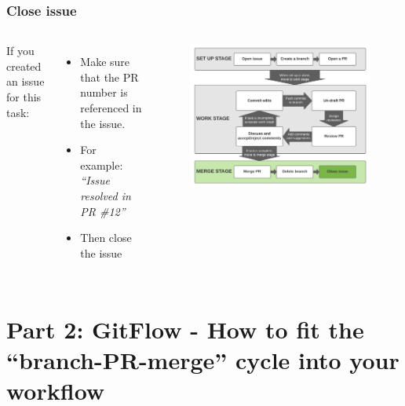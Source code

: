 \documentclass[aspectratio=169]{beamer} %
\begin{document}
\begin{frame}
	\frametitle{Close issue}
	\begin{columns}[c]

		If you created an issue for this task:
		\begin{itemize}
			\setlength\itemsep{.5em}
			\item Make sure that the PR number is referenced in the issue.
			\item For example: \textit{``Issue resolved in PR \#12''}
			\item Then close the issue
		\end{itemize}

		\vspace{-.75cm}
		\begin{figure}
			\centering
			\includegraphics[width=\textwidth]{./img/branch-pr-merge-cycle-S3-3.png}
		\end{figure}

	\end{columns}
\end{frame}



\section{Part 2: \newline GitFlow - How to fit the ``branch-PR-merge'' cycle into your workflow}
\end{document}
